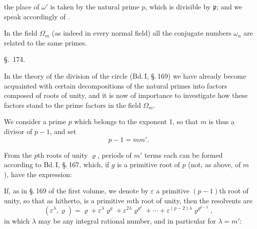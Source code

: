 the place of $\omega'$ is taken by the natural prime $p$, which is divisible
by $\mathfrak p$; and we speak accordingly of .


In the field $\Omega_m$ (as indeed in every normal field) all
the conjugate numbers $\omega_n$ are related to the same primes.

\begin{center}
\S.\ 174.

\end{center}

In the theory of the division of the circle (Bd.\,I, \S.\,169)
we have already become acquainted with certain decompositions of the
natural primes into factors composed of roots of unity,
and it is now of importance to investigate how these
factors stand to the prime factors in the field $\Omega_m$.

We consider a prime $p$ which belongs to the exponent 1,
so that $m$ is thus a divisor of $p-1$, and set
\[
p - 1 = m m'.
\]

From the $p$th roots of unity $\varrho$, periods of $m'$ terms each
can be formed according to Bd.\,I, \S.\,167, which, if $g$ is a primitive
root of $p$ (not, as above, of $m$), have the expression:

If, as in \S.\,169 of the first volume, we denote by $\varepsilon$ a
primitive $(p-1)$th root of unity, so that
as hitherto, is a primitive $m$th root of unity, then the
resolvents are
\begin{equation*}\tag*{3)}
(\varepsilon^\lambda, \varrho) = \varrho + \varepsilon^\lambda \varrho^g + \varepsilon^{2\lambda}\varrho^{g^2} + \cdots + \varepsilon^{(p-2)\lambda}\varrho^{g^{p-2}},
\end{equation*}
in which $\lambda$ may be any integral rational number, and in
particular for $\lambda = m'$:
